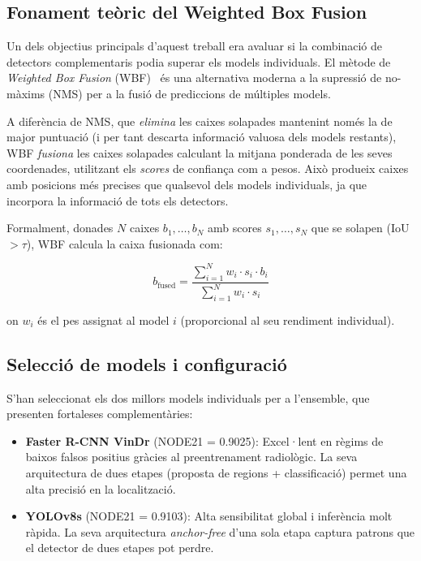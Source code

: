 \subsection{Fonament teòric del Weighted Box Fusion}

Un dels objectius principals d'aquest treball era avaluar si la combinació de detectors complementaris podia superar els models individuals. El mètode de \textit{Weighted Box Fusion} (WBF)~\cite{solovyev2021wbf} és una alternativa moderna a la supressió de no-màxims (NMS) per a la fusió de prediccions de múltiples models.

A diferència de NMS, que \textit{elimina} les caixes solapades mantenint només la de major puntuació (i per tant descarta informació valuosa dels models restants), WBF \textit{fusiona} les caixes solapades calculant la mitjana ponderada de les seves coordenades, utilitzant els \textit{scores} de confiança com a pesos. Això produeix caixes amb posicions més precises que qualsevol dels models individuals, ja que incorpora la informació de tots els detectors.

Formalment, donades $N$ caixes $b_1, \ldots, b_N$ amb scores $s_1, \ldots, s_N$ que se solapen (IoU $> \tau$), WBF calcula la caixa fusionada com:

\begin{equation}
    b_{\text{fused}} = \frac{\sum_{i=1}^{N} w_i \cdot s_i \cdot b_i}{\sum_{i=1}^{N} w_i \cdot s_i}
\end{equation}

on $w_i$ és el pes assignat al model $i$ (proporcional al seu rendiment individual).

\subsection{Selecció de models i configuració}

S'han seleccionat els dos millors models individuals per a l'ensemble, que presenten fortaleses complementàries:

\begin{itemize}
    \item \textbf{Faster R-CNN VinDr} (NODE21 = 0.9025): Excel·lent en règims de baixos falsos positius gràcies al preentrenament radiològic. La seva arquitectura de dues etapes (proposta de regions + classificació) permet una alta precisió en la localització.
    \item \textbf{YOLOv8s} (NODE21 = 0.9103): Alta sensibilitat global i inferència molt ràpida. La seva arquitectura \textit{anchor-free} d'una sola etapa captura patrons que el detector de dues etapes pot perdre.
\end{itemize}


